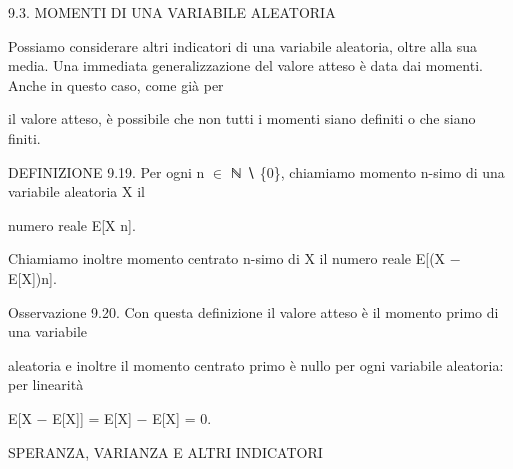 \documentclass[a4paper,portrait,12pt]{article}
\begin{document}
\begin{flushleft}
9.3. MOMENTI DI UNA VARIABILE ALEATORIA
\end{flushleft}


\begin{flushleft}
Possiamo considerare altri indicatori di una variabile aleatoria, oltre alla sua media. Una immediata generalizzazione del valore atteso \`{e} data dai momenti. Anche in questo caso, come gi\`{a} per
\end{flushleft}


\begin{flushleft}
il valore atteso, \`{e} possibile che non tutti i momenti siano definiti o che siano finiti.
\end{flushleft}


\begin{flushleft}
DEFINIZIONE 9.19. Per ogni n $\in$ ℕ ∖ \{0\}, chiamiamo momento n-simo di una variabile aleatoria X il
\end{flushleft}


\begin{flushleft}
numero reale E[X n].
\end{flushleft}


\begin{flushleft}
Chiamiamo inoltre momento centrato n-simo di X il numero reale E[(X $-$ E[X])n].
\end{flushleft}


\begin{flushleft}
Osservazione 9.20. Con questa definizione il valore atteso \`{e} il momento primo di una variabile
\end{flushleft}


\begin{flushleft}
aleatoria e inoltre il momento centrato primo \`{e} nullo per ogni variabile aleatoria: per linearit\`{a}
\end{flushleft}


\begin{flushleft}
E[X $-$ E[X]] = E[X] $-$ E[X] = 0.
\end{flushleft}










\begin{flushleft}
SPERANZA, VARIANZA E ALTRI INDICATORI
\end{flushleft}
\end{document}
